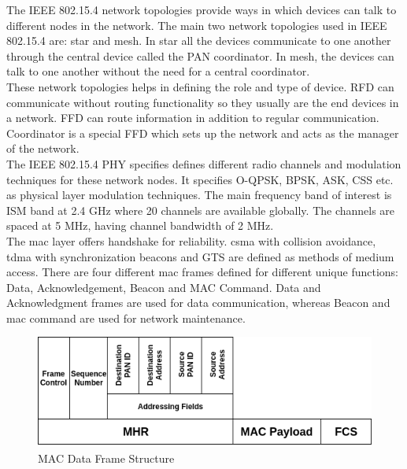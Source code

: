 The IEEE 802.15.4 network topologies provide ways in which devices can talk to different nodes in the network.
The main two network topologies used in IEEE 802.15.4 are: star and mesh.
In star all the devices communicate to one another through the central device called the \ac{PAN} coordinator.
In mesh, the devices can talk to one another without the need for a central coordinator.\\

These network topologies helps in defining the role and type of device.
\ac{RFD} can communicate without routing functionality so they usually are the end devices in a network.
\ac{FFD} can route information in addition to regular communication.
Coordinator is a special \ac{FFD} which sets up the network and acts as the manager of the network.\\

The IEEE 802.15.4 \ac{PHY} specifies defines different radio channels and modulation techniques for these network nodes.
It specifies \ac{O-QPSK}, \ac{BPSK}, \ac{ASK}, \ac{CSS} etc. as physical layer modulation techniques.
The main frequency band of interest is ISM band at 2.4 GHz where 20  channels are available globally.
The channels are spaced at 5 MHz, having channel bandwidth of 2 MHz.\\

The \ac{mac} layer offers handshake for reliability.
\ac{csma} with collision avoidance, \ac{tdma} with synchronization beacons and \ac{GTS} are defined as methods of medium access.
There are four different \ac{mac} frames defined for different unique functions: Data, Acknowledgement, Beacon and MAC Command.
Data and Acknowledgment frames are used for data communication, whereas Beacon and \ac{mac} command are used for network maintenance.\\

\begin{figure}[h!]
\centering
\includegraphics[scale=0.6]{Figure/DataFrame.png}
\caption{MAC Data Frame Structure}
\label{data_frame}
\end{figure}

